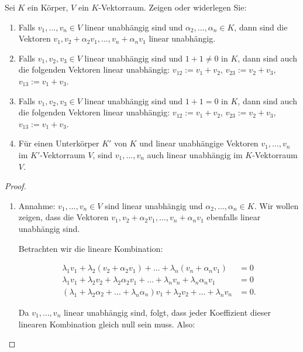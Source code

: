 \documentclass{../problemset}
\begin{document}
\begin{problem}
Sei $K$ ein Körper, $V$ ein $K$-Vektorraum. Zeigen oder widerlegen Sie:
\begin{enumerate}
	\item Falls $v_1, \ldots, v_n \in V$ linear unabhängig sind und $\alpha_2, \ldots, \alpha_n \in K$, dann sind die Vektoren $v_1, v_2 + \alpha_2v_1, \ldots, v_n + \alpha_nv_1$ linear unabhängig.
	\item Falls $v_1, v_2, v_3 \in V$ linear unabhängig sind und $1 + 1 \neq 0$ in $K$, dann sind auch die folgenden Vektoren linear unabhängig: $v_{12} := v_1 + v_2$, $v_{23} := v_2 + v_3$, $v_{13} := v_1 + v_3$.
	\item Falls $v_1, v_2, v_3 \in V$ linear unabhängig sind und $1 + 1 = 0$ in $K$, dann sind auch die folgenden Vektoren linear unabhängig: $v_{12} := v_1 + v_2$, $v_{23} := v_2 + v_3$, $v_{13} := v_1 + v_3$.
	\item Für einen Unterkörper $K'$ von $K$ und linear unabhängige Vektoren $v_1, \ldots, v_n$ im $K'$-Vektorraum $V$, sind $v_1, \ldots, v_n$ auch linear unabhängig im $K$-Vektorraum $V$.
\end{enumerate}
\begin{proof}
	$ $

	\begin{enumerate}
		\item Annahme: $v_1, \ldots, v_n \in V$ sind linear unabhängig und $\alpha_2, \ldots, \alpha_n \in K$.
		      Wir wollen zeigen, dass die Vektoren $v_1, v_2 + \alpha_2v_1, \ldots, v_n + \alpha_nv_1$ ebenfalls linear unabhängig sind.

		      Betrachten wir die lineare Kombination:

		      \begin{align*}
			      \lambda_1 v_1 + \lambda_2 (v_2 + \alpha_2 v_1) + \ldots + \lambda_n (v_n + \alpha_n v_1)               & = 0  \\
			      \lambda_1 v_1 + \lambda_2v_2 + \lambda_2\alpha_2v_1 + \ldots + \lambda_nv_n + \lambda_n\alpha_nv_1     & = 0  \\
			      (\lambda_1 + \lambda_2\alpha_2 + \ldots + \lambda_n\alpha_n)v_1 + \lambda_2v_2 + \ldots + \lambda_nv_n & = 0.
		      \end{align*}

		      Da $v_1, \ldots, v_n$ linear unabhängig sind, folgt, dass jeder Koeffizient dieser linearen Kombination gleich null sein muss.
		      Also:


\end{enumerate}
\end{proof}
\end{problem}
\end{document}
